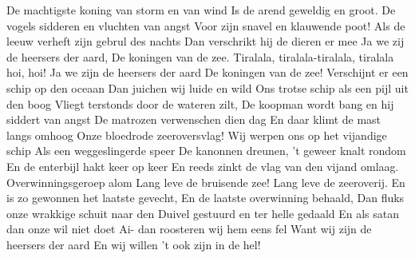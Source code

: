 \beginverse*
De machtigste koning van storm en van wind 
Is de arend geweldig en groot. 
De vogels sidderen en vluchten van angst 
Voor zijn snavel en klauwende poot! 
Als de leeuw verheft zijn gebrul des nachts 
Dan verschrikt hij de dieren er mee 
Ja we zij de heersers der aard,
De koningen van de zee.
\endverse
\beginchorus
Tiralala, tiralala-tiralala, tiralala hoi, hoi! 
Ja we zijn de heersers der aard 
De koningen van de zee! 
\endchorus
\beginverse*
Verschijnt er een schip op den oceaan 
Dan juichen wij luide en wild 
Ons trotse schip als een pijl uit den boog 
Vliegt terstonds door de wateren zilt, 
De koopman wordt bang en hij siddert van angst 
De matrozen verwenschen dien dag 
En daar klimt de mast langs omhoog 
Onze bloedrode zeeroversvlag!
\endverse
\beginverse*
Wij werpen ons op het vijandige schip 
Als een weggeslingerde speer 
De kanonnen dreunen, ’t geweer knalt rondom
En de enterbijl hakt keer op keer
En reeds zinkt de vlag van den vijand omlaag. Overwinningsgeroep alom Lang leve de bruisende zee! Lang leve de zeeroverij. 
\endverse
\beginverse*
En is zo gewonnen het laatste gevecht, 
En de laatste overwinning behaald, 
Dan fluks onze wrakkige schuit naar den 
Duivel gestuurd en ter helle gedaald 
En als satan dan onze wil niet doet Ai- dan roosteren wij hem eens fel 
Want wij zijn de heersers der aard 
En wij willen ’t ook zijn in de hel!
\endverse
\endsong